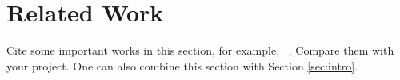 \section{Related Work}
\label{sec:related-work}

Cite some important works in this section, for example, ~\cite{bertsekas12book-optimalcontrol}. 
Compare them with your project. One can also combine this section with Section \ref{sec:intro}.
